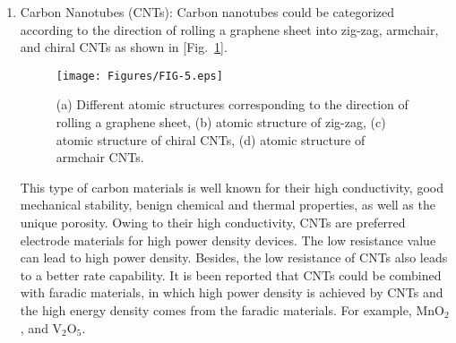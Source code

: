 \documentclass[reprint,amsmath,amssymb,aps,floatfix,
]{revtex4-2}
\begin{document}
\begin{enumerate}
    \item Carbon Nanotubes (CNTs): Carbon nanotubes could be categorized according to the direction of rolling a graphene sheet into zig-zag, armchair, and chiral CNTs as shown in [Fig.~\ref{fig:fig5}].\begin{figure}[b] \centering\texttt{[image: Figures/FIG-5.eps]}\caption{\label{fig:fig5}(a) Different atomic structures corresponding to the direction of rolling a graphene sheet, (b) atomic structure of zig-zag, (c) atomic structure of chiral CNTs, (d) atomic structure of armchair CNTs.}\end{figure} This type of carbon materials is well known for their high conductivity, good mechanical stability, benign chemical and thermal properties, as well as the unique porosity. Owing to their high conductivity, CNTs are preferred electrode materials for high power density devices. The low resistance value can lead to high power density. Besides, the low resistance of CNTs also leads to a better rate capability. It is been reported that CNTs could be combined with faradic materials, in which high power density is achieved by CNTs and the high energy density comes from the faradic materials. For example, MnO$_2$,\cite{Li2014} and V$_2$O$_5$.\cite{Zheng2011}

\end{enumerate}
\end{document}
